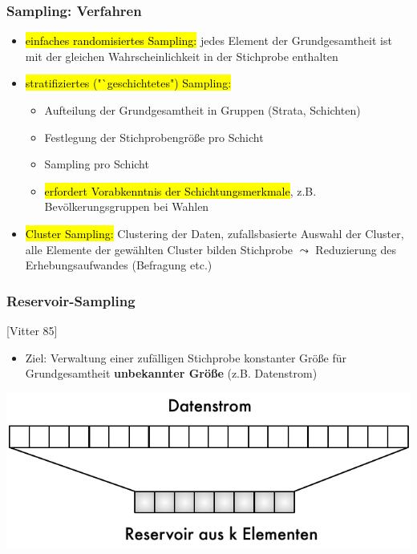     
    \begin{frame}
    \frametitle{Sampling: Verfahren}
    
    \begin{itemize}
    \item \hl{einfaches randomisiertes Sampling:} jedes Element der Grundgesamtheit ist mit der gleichen Wahrscheinlichkeit in der Stichprobe enthalten
    \item \hl{stratifiziertes ("`geschichtetes") Sampling:} 
    \begin{itemize}
    \item Aufteilung der Grundgesamtheit in Gruppen (Strata, Schichten)
    \item Festlegung der Stichprobengröße pro Schicht
    \item Sampling pro Schicht
    \item \hl{erfordert Vorabkenntnis der Schichtungsmerkmale}, z.B. Bevölkerungsgruppen bei Wahlen
    \end{itemize}
    \item \hl{Cluster Sampling:} Clustering der Daten, zufallsbasierte Auswahl der Cluster, alle Elemente der gewählten Cluster bilden Stichprobe $\leadsto$ Reduzierung des Erhebungsaufwandes (Befragung etc.)
    \end{itemize}
    \end{frame}
    
    
    \begin{frame}
    \frametitle{Reservoir-Sampling}
    
    [Vitter 85]
    \begin{itemize}
    \item Ziel: Verwaltung einer zufälligen Stichprobe konstanter Größe
      für Grundgesamtheit \textbf{unbekannter Größe} (z.B. Datenstrom)
    \end{itemize}
    
    \begin{center}
    \includegraphics[scale=.7]{fig4/reservoir-sampling.pdf}
    \end{center}
    
    \end{frame}
    
